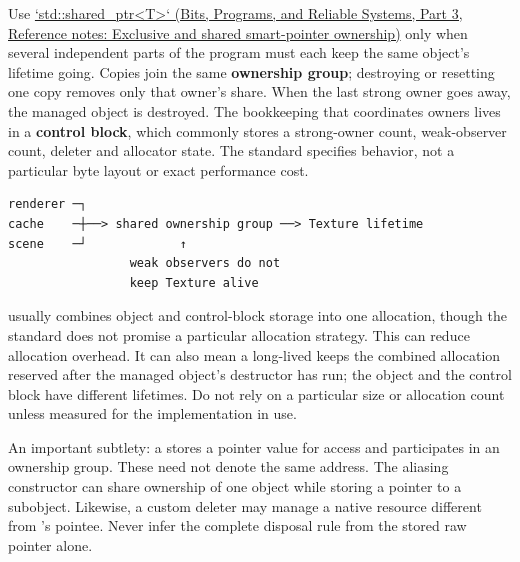 \hypertarget{05-engine-i-ch004-shared-ownership-one-object-a-group-of-owners-and-a-separate-control-block}{}

Use \href{../01-Bits-Programs-and-Reliable-Systems-P03/main.pdf\#nameddest=appendix-51602cabe815}{`std::shared\_ptr\textless T\textgreater` (Bits, Programs, and Reliable Systems, Part 3, Reference notes: Exclusive and shared smart-pointer ownership)} only when several independent parts of the program must each keep the same object's lifetime going. Copies join the same \textbf{ownership group}; destroying or resetting one copy removes only that owner's share. When the last strong owner goes away, the managed object is destroyed. The bookkeeping that coordinates owners lives in a \textbf{control block}, which commonly stores a strong-owner count, weak-observer count, deleter and allocator state. The standard specifies behavior, not a particular byte layout or exact performance cost.

\begin{verbatim}
renderer ─┐
cache    ─┼──> shared ownership group ──> Texture lifetime
scene    ─┘             ↑
                 weak observers do not
                 keep Texture alive
\end{verbatim}

 usually combines object and control-block storage into one allocation, though the standard does not promise a particular allocation strategy. This can reduce allocation overhead. It can also mean a long-lived  keeps the combined allocation reserved after the managed object's destructor has run; the object and the control block have different lifetimes. Do not rely on a particular size or allocation count unless measured for the implementation in use.

An important subtlety: a  stores a pointer value for access and participates in an ownership group. These need not denote the same address. The aliasing constructor can share ownership of one object while storing a pointer to a subobject. Likewise, a custom deleter may manage a native resource different from 's pointee. Never infer the complete disposal rule from the stored raw pointer alone.

